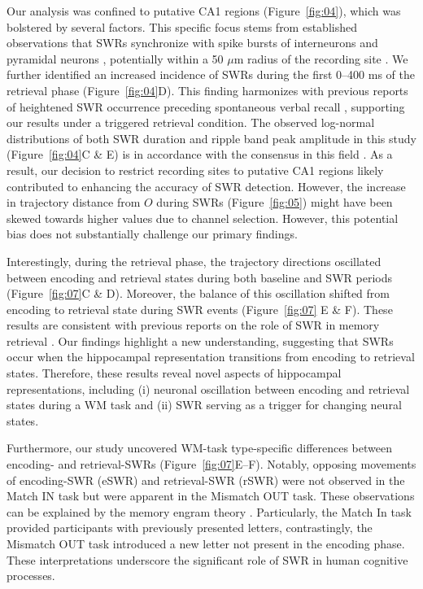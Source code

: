 \documentclass[final,3p,times,twocolumn]{elsarticle}
\begin{document}
Our analysis was confined to putative CA1 regions (Figure~\ref{fig:04}), which was bolstered by several factors. This specific focus stems from established observations that SWRs synchronize with spike bursts of interneurons and pyramidal neurons \cite{buzsaki_two-stage_1989} \cite{quyen_cell_2008} \cite{royer_control_2012} \cite{hajos_input-output_2013}, potentially within a 50 $\mu$m radius of the recording site \cite{schomburg_spiking_2012}. We further identified an increased incidence of SWRs during the first 0--400 ms of the retrieval phase (Figure~\ref{fig:04}D). This finding harmonizes with previous reports of heightened SWR occurrence preceding spontaneous verbal recall \cite{norman_hippocampal_2019} \cite{norman_hippocampal_2021}, supporting our results under a triggered retrieval condition. The observed log-normal distributions of both SWR duration and ripple band peak amplitude in this study (Figure~\ref{fig:04}C \& E) is in accordance with the consensus in this field \cite{liu_consensus_2022}. As a result, our decision to restrict recording sites to putative CA1 regions likely contributed to enhancing the accuracy of SWR detection. However, the increase in trajectory distance from $O$ during SWRs (Figure~\ref{fig:05}) might have been skewed towards higher values due to channel selection. However, this potential bias does not substantially challenge our primary findings.

Interestingly, during the retrieval phase, the trajectory directions oscillated between encoding and retrieval states during both baseline and SWR periods (Figure~\ref{fig:07}C \& D). Moreover, the balance of this oscillation shifted from encoding to retrieval state during SWR events (Figure~\ref{fig:07} E \& F). These results are consistent with previous reports on the role of SWR in memory retrieval \cite{norman_hippocampal_2019} \cite{norman_hippocampal_2021}. Our findings highlight a new understanding, suggesting that SWRs occur when the hippocampal representation transitions from encoding to retrieval states. Therefore, these results reveal novel aspects of hippocampal representations, including (i) neuronal oscillation between encoding and retrieval states during a WM task and (ii) SWR serving as a trigger for changing neural states.

Furthermore, our study uncovered WM-task type-specific differences between encoding- and retrieval-SWRs (Figure~\ref{fig:07}E--F). Notably, opposing movements of encoding-SWR (eSWR) and retrieval-SWR (rSWR) were not observed in the Match IN task but were apparent in the Mismatch OUT task. These observations can be explained by the memory engram theory \cite{liu_optogenetic_2012}. Particularly, the Match In task provided participants with previously presented letters, contrastingly, the Mismatch OUT task introduced a new letter not present in the encoding phase. These interpretations underscore the significant role of SWR in human cognitive processes.
\end{document}
